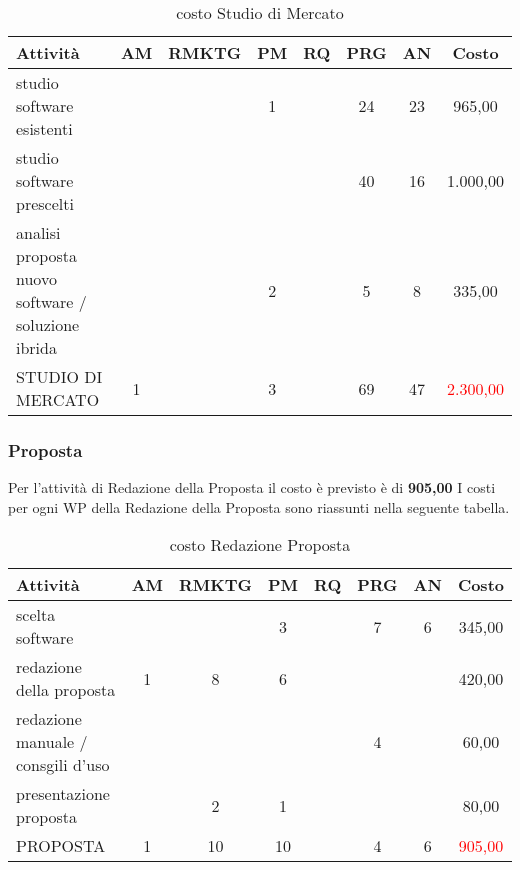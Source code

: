 \begin{table}[!h]
\centering
\begin{tabular}{|l|c|c|c|c|c|c|c|}
\hline
\textbf{Attività}& \textbf{AM} & \textbf{RMKTG} & \textbf{PM} & \textbf{RQ} & \textbf{PRG} & \textbf{AN} & \textbf{Costo}  \\ 
              
\hline
studio software esistenti & & & 1& & 24& 23& \text{\euro} 965,00\\
studio software prescelti	 				  & & &	&	&40 &16 & \text{\euro} 1.000,00 \\	
 \parbox{162 px}{analisi proposta nuovo software / soluzione ibrida} 					  & & &2 & 	&5	&  8  &  	\text{\euro} 335,00 \\			  
\hline
STUDIO DI MERCATO  							& 1 &  &3 & &69	&47	&	\textcolor{red}{ \text{\euro}2.300,00 }\\		 
\hline
\end{tabular}
\caption{costo Studio di Mercato}\label{tab:mercato}
\end{table}







\subsubsection{Proposta}
Per l'attività di Redazione della Proposta il costo è previsto è di \textbf	{ \text{\euro} 905,00 }	
I costi per ogni WP della Redazione della Proposta sono riassunti nella seguente tabella.


\begin{table}[!h]
\centering
\begin{tabular}{|l|c|c|c|c|c|c|c|}
\hline
\textbf{Attività}& \textbf{AM} & \textbf{RMKTG} & \textbf{PM} & \textbf{RQ} & \textbf{PRG} & \textbf{AN} & \textbf{Costo}  \\ 
              
\hline

scelta software			& & & 3&	& 7&	6& 	\text{\euro} 345,00 \\
redazione della proposta & 1&	8&	6& & & & 	 \text{\euro} 420,00 \\
redazione manuale / consgili d'uso & & & & & 					4 && 	\text{\euro} 60,00 \\	
presentazione proposta		 & & 2&  	1	& & 	& & 		 \text{\euro} 80,00 \\	

	  
\hline
PROPOSTA  							& 1  &10 &10& &	4&	6&	\textcolor{red}{ \text{\euro} 905,00 }\\		 
\hline
\end{tabular}
\caption{costo Redazione Proposta}\label{tab:proposta}
\end{table}	
	
